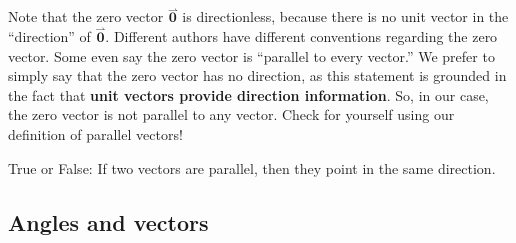 \documentclass{ximera}
\begin{document}
Note that the zero vector $\overset{\rightharpoonup}{\mathbf{0}}$ is directionless, because
there is no unit vector in the ``direction'' of $\overset{\rightharpoonup}{\mathbf{0}}$. Different
authors have different conventions regarding the zero vector. Some
even say the zero vector is ``parallel to every vector.'' We prefer to simply say
that the zero vector has no direction, as this statement is grounded in the fact
that \textbf{unit vectors provide direction information}.  So, in our case, 
the zero vector is not parallel to any vector.  Check for yourself 
using our definition of parallel vectors!

\begin{question}
  True or False: If two vectors are parallel, then they point in the same direction.
  \begin{prompt}
    \begin{multipleChoice}
    \end{multipleChoice}
  \end{prompt}
\end{question}




\subsection{Angles and vectors}
\end{document}
